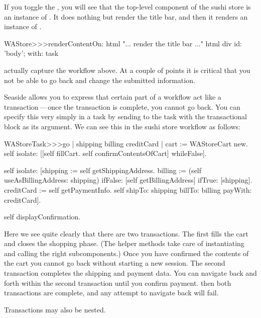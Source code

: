 \documentclass[a4paper,10pt,twoside]{book}
\begin{document}
If you toggle the , you will see that the top-level component of the sushi store is an instance of .
It does nothing but render the title bar, and then it renders an instance of .

\begin{code}{}
WAStore>>>renderContentOn: html
	"... render the title bar ..."
	html div id: 'body'; with: task
\end{code}

 actually capture the workflow above.
At a couple of points it is critical that you not be able to go back and change the submitted information.


Seaside allows you to express that certain part of a workflow act like a transaction\,---\,once the transaction is complete, you cannot go back.
You can specify this very simply in a task by sending  to the task with the transactional block as its argument.
We can see this in the sushi store workflow as follows:

\begin{code}{}
WAStoreTask>>>go
	| shipping billing creditCard |
	cart := WAStoreCart new.
	self isolate:
		[[self fillCart.
		self confirmContentsOfCart]
			whileFalse].

	self isolate:
		[shipping := self getShippingAddress.
		billing := (self useAsBillingAddress: shipping)
					ifFalse: [self getBillingAddress]
					ifTrue: [shipping].
		creditCard := self getPaymentInfo.
		self shipTo: shipping billTo: billing payWith: creditCard].

	self displayConfirmation.
\end{code}

Here we see quite clearly that there are two transactions.
The first fills the cart and closes the shopping phase.
(The helper methods  \etc take care of instantiating and calling the right subcomponents.)
Once you have confirmed the contents of the cart you cannot go back without starting a new session.
The second transaction completes the shipping and payment data.
You can navigate back and forth within the second transaction until you confirm payment.
then both transactions are complete, and any attempt to navigate back will fail.

Transactions may also be nested.
\end{document}
